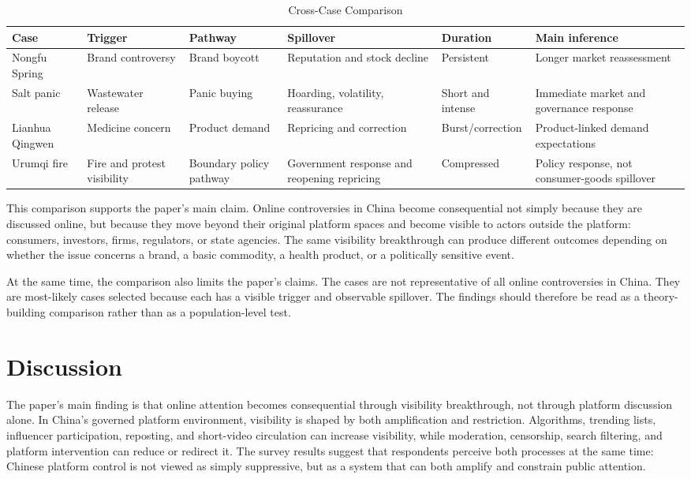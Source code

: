 \documentclass[conference]{IEEEtran}
\begin{document}
\begin{table}[!b]
\centering
\caption{Cross-Case Comparison}
\label{tab:cross_case}
{\footnotesize
\setlength{\tabcolsep}{4pt}
\begin{tabular}{p{}p{}p{}p{}p{}p{}}
\toprule
Case & Trigger & Pathway & Spillover & Duration & Main inference \\
\midrule
Nongfu Spring & Brand controversy & Brand boycott & Reputation and stock decline & Persistent & Longer market reassessment \\
Salt panic & Wastewater release & Panic buying & Hoarding, volatility, reassurance & Short and intense & Immediate market and governance response \\
Lianhua Qingwen & Medicine concern & Product demand & Repricing and correction & Burst/correction & Product-linked demand expectations \\
Urumqi fire & Fire and protest visibility & Boundary policy pathway & Government response and reopening repricing & Compressed & Policy response, not consumer-goods spillover \\
\bottomrule
\end{tabular}
}
\end{table}

This comparison supports the paper's main claim. Online controversies in China become consequential not simply because they are discussed online, but because they move beyond their original platform spaces and become visible to actors outside the platform: consumers, investors, firms, regulators, or state agencies. The same visibility breakthrough can produce different outcomes depending on whether the issue concerns a brand, a basic commodity, a health product, or a politically sensitive event.

At the same time, the comparison also limits the paper's claims. The cases are not representative of all online controversies in China. They are most-likely cases selected because each has a visible trigger and observable spillover. The findings should therefore be read as a theory-building comparison rather than as a population-level test.

\section{Discussion}
The paper's main finding is that online attention becomes consequential through visibility breakthrough, not through platform discussion alone. In China's governed platform environment, visibility is shaped by both amplification and restriction. Algorithms, trending lists, influencer participation, reposting, and short-video circulation can increase visibility, while moderation, censorship, search filtering, and platform intervention can reduce or redirect it. The survey results suggest that respondents perceive both processes at the same time: Chinese platform control is not viewed as simply suppressive, but as a system that can both amplify and constrain public attention.
\end{document}
